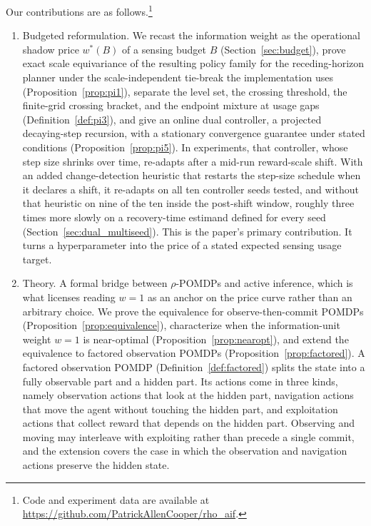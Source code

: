 Our contributions are as follows.\footnote{Code and experiment data are available at \url{https://github.com/PatrickAllenCooper/rho_aif}.}
\begin{enumerate}
    \item Budgeted reformulation. We recast the information weight as the operational shadow price $w^*(B)$ of a sensing budget $B$ (Section~\ref{sec:budget}), prove exact scale equivariance of the resulting policy family for the receding-horizon planner under the scale-independent tie-break the implementation uses (Proposition~\ref{prop:pi1}), separate the level set, the crossing threshold, the finite-grid crossing bracket, and the endpoint mixture at usage gaps (Definition~\ref{def:pi3}), and give an online dual controller, a projected decaying-step recursion, with a stationary convergence guarantee under stated conditions (Proposition~\ref{prop:pi5}). In experiments, that controller, whose step size shrinks over time, re-adapts after a mid-run reward-scale shift. With an added change-detection heuristic that restarts the step-size schedule when it declares a shift, it re-adapts on all ten controller seeds tested, and without that heuristic on nine of the ten inside the post-shift window, roughly three times more slowly on a recovery-time estimand defined for every seed (Section~\ref{sec:dual_multiseed}). This is the paper's primary contribution. It turns a hyperparameter into the price of a stated expected sensing usage target.
    \item Theory. A formal bridge between $\rho$-POMDPs and active inference, which is what licenses reading $w{=}1$ as an anchor on the price curve rather than an arbitrary choice. We prove the equivalence for observe-then-commit POMDPs (Proposition~\ref{prop:equivalence}), characterize when the information-unit weight $w{=}1$ is near-optimal (Proposition~\ref{prop:nearopt}), and extend the equivalence to factored observation POMDPs (Proposition~\ref{prop:factored}). A factored observation POMDP (Definition~\ref{def:factored}) splits the state into a fully observable part and a hidden part. Its actions come in three kinds, namely observation actions that look at the hidden part, navigation actions that move the agent without touching the hidden part, and exploitation actions that collect reward that depends on the hidden part. Observing and moving may interleave with exploiting rather than precede a single commit, and the extension covers the case in which the observation and navigation actions preserve the hidden state.

\end{enumerate}
